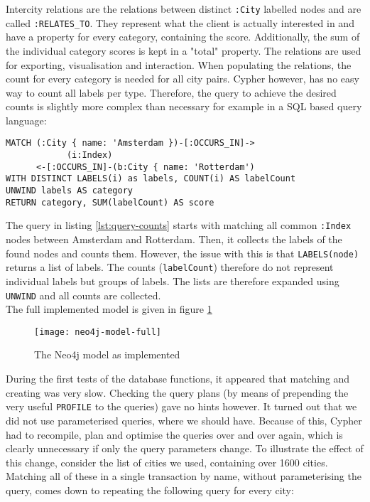 Intercity relations are the relations between distinct \texttt{:City} labelled nodes and are called \texttt{:RELATES\_TO}. They represent what the client is actually interested in and have a property for every category, containing the score. Additionally, the sum of the individual category scores is kept in a "total" property. The relations are used for exporting, visualisation and interaction. When populating the relations, the count for every category is needed for all city pairs. Cypher however, has no easy way to count all labels per type. Therefore, the query to achieve the desired counts is slightly more complex than necessary for example in a SQL based query language:

\begin{lstlisting}[language=cypher, caption={Counting distinct labels}, label={lst:query-counts}]
MATCH (:City { name: 'Amsterdam })-[:OCCURS_IN]->
            (i:Index)
      <-[:OCCURS_IN]-(b:City { name: 'Rotterdam')
WITH DISTINCT LABELS(i) as labels, COUNT(i) AS labelCount
UNWIND labels AS category
RETURN category, SUM(labelCount) AS score
\end{lstlisting}

The query in listing \ref{lst:query-counts} starts with matching all common \texttt{:Index} nodes between Amsterdam and Rotterdam. Then, it collects the labels of the found nodes and counts them.
However, the issue with this is that \texttt{LABELS(node)} returns a list of labels. The counts (\texttt{labelCount}) therefore do not represent individual labels but groups of labels. The lists are therefore expanded using \texttt{UNWIND} and all counts are collected.\\

The full implemented model is given in figure \ref{fig:neo4j-model-full}

\begin{figure}[H]
    \centering
    \texttt{[image: neo4j-model-full]}
    \caption{The Neo4j model as implemented}
    \label{fig:neo4j-model-full}
\end{figure}

During the first tests of the database functions, it appeared that matching and creating was very slow. Checking the query plans (by means of prepending the very useful \texttt{PROFILE} to the queries) gave no hints however. It turned out that we did not use parameterised queries, where we should have. Because of this, Cypher had to recompile, plan and optimise the queries over and over again, which is clearly unnecessary if only the query parameters change. To illustrate the effect of this change, consider the list of cities we used, containing over 1600 cities. Matching all of these in a single transaction by name, without parameterising the query, comes down to repeating the following query for every city:


